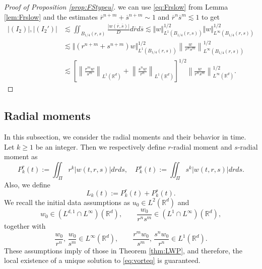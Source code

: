 \documentclass[11pt]{amsart}
\theoremstyle{definition}
\theoremstyle{remark}
\numberwithin{equation}{section}
\numberwithin{equation}{section}
\newcommand{\nrm}[1]{\Vert#1\Vert}
\newcommand{\br}[1]{\overline{#1}}
\newcommand{\0}{\emptyset}
\newcommand{\ift}{\infty}
\newcommand{\bbR}{\mathbb R}
\begin{document}
\begin{proof}[Proof of Proposition \ref{prop:FStypeu}]
		we can use 
		\eqref{eq:Frslow} from Lemma \ref{lem:Frslow} and the estimates $ \br{r}^{n+m}+\br{s}^{n+m}\sim 1 $ and $\br{r}^{n}\br{s}^{m}\lesssim 1$ to get
		\begin{equation}
			\begin{aligned}
				|(I_{2})|, |(I_{2}')|&%
				\lesssim \iint_{B_{1/4}(r,s)}\frac{|w(\br{r},\br{s})|}{D}d\br{r}d\br{s}\lesssim \nrm{w}_{L^{1}(B_{1/4}(r,s))}^{1/2}\nrm{w}_{L^{\ift}(B_{1/4}(r,s))}^{1/2}\\
				&\lesssim \nrm{(r^{n+m}+s^{n+m})w}_{L^{1}(B_{1/4}(r,s))}^{1/2}\left\| \frac{w}{r^{n}s^{m}}\right\|_{L^{\ift}(B_{1/4}(r,s))}^{1/2}\\
				&\lesssim \left[\left\| \frac{r^{m}w}{s^{m}}\right\|_{L^{1}(\bbR^{d})}+\left\| \frac{s^{n}w}{r^{n}}\right\|_{L^{1}(\bbR^{d})}\right]^{1/2}\left\| \frac{w}{r^{n}s^{m}}\right\|_{L^{\ift}(\bbR^{d})}^{1/2}.
			\end{aligned}
		\end{equation}
	\end{proof}

	
	\subsection{Radial moments}
	In this subsection, we consider the radial moments and their behavior in time. 
	Let $k\geq 1$ be an integer. Then we respectively define $r$-radial moment and $s$-radial moment as
	\begin{equation}
		P_{k}^{r}(t):=\iint_{\Pi}r^{k}|w(t,r,s)|drds,\quad P_{k}^{s}(t):=\iint_{\Pi}s^{k}|w(t,r,s)|drds.
	\end{equation}
	Also, we define
	\begin{equation}
		L_{k}(t):=P_{k}^{r}(t)+P_{k}^{s}(t).
	\end{equation}
	We recall the initial data assumptions as $u_0\in L^2(\mathbb{R}^d)$ and 
	\[ 
	w_{0}\in (L^{d,1}\cap L^{\ift})(\bbR^{d}), \qquad \frac{w_0}{r^ns^m}\in (L^1\cap L^{\infty}) (\mathbb{R}^d),
	\] 
	together with
	\[
	\frac{w_0}{r^n}, \, \frac{w_0}{s^m} \in L^{\infty}(\mathbb{R}^d), \qquad \frac{r^m w_0}{s^m}, \, \frac{s^n w_0}{r^n} \in L^1 (\mathbb{R}^d).
	\]
	These assumptions imply of those in Theorem \ref{thm:LWP}, and therefore, the local existence of a unique solution to \eqref{eq:vorteq} is guaranteed. 
	
\end{document}
